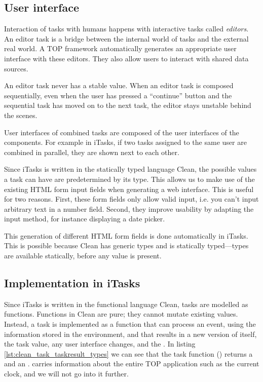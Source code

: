 \subsection{User interface}
Interaction of tasks with humans happens with interactive tasks called \textit{editors}. An editor task is a bridge between the internal world of tasks and the external real world.
A TOP framework automatically generates an appropriate user interface with these editors. They also allow users to interact with shared data sources.

An editor task never has a stable value. When an editor task is composed sequentially, even when the user has pressed a ``continue'' button and the sequential task has moved on to the next task, the editor stays unstable behind the scenes.

User interfaces of combined tasks are composed of the user interfaces of the components. For example in iTasks, if two tasks assigned to the same user are combined in parallel, they are shown next to each other. \cite[\S 4.2.4]{naus2020assisting}

Since iTasks is written in the statically typed language Clean, the possible values a task can have are predetermined by its type. This allows us to make use of the existing HTML form input fields when generating a web interface. This is useful for two reasons. First, these form fields only allow valid input, i.e. you can't input arbitrary text in a number field. Second, they improve usability by adapting the input method, for instance displaying a date picker.

This generation of different HTML form fields is done automatically in iTasks. This is possible because Clean has generic types and is statically typed---types are available statically, before any value is present.

\subsection{Implementation in iTasks}
Since iTasks is written in the functional language Clean, tasks are modelled as functions. Functions in Clean are pure; they cannot mutate existing values. Instead, a task is implemented as a function that can process an event, using the information stored in the  environment, and that results in a new version of itself, the task value, any user interface changes, and the .
In listing \ref{lst:clean_task_taskresult_types} we can see that the task function () returns a  and an .  carries information about the entire TOP application such as the current clock, and we will not go into it further.

